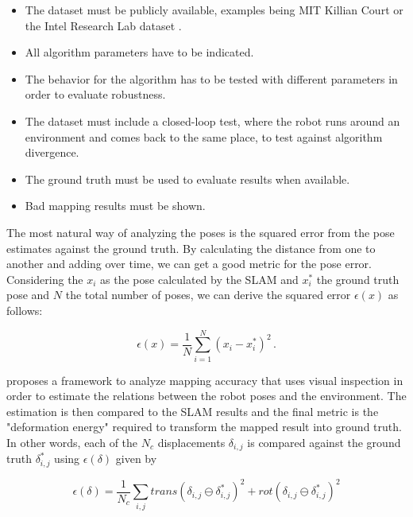 \begin{itemize}
    \item The dataset must be publicly available, examples being MIT Killian Court or the Intel Research Lab dataset \cite{kummerle2009measuring}.
    \item All algorithm parameters have to be indicated.
    \item The behavior for the algorithm has to be tested with different parameters in order to evaluate robustness.
    \item The dataset must include a closed-loop test, where the robot runs around an environment and comes back to the same place, to test against algorithm divergence.
    \item The ground truth must be used to evaluate results when available.
    \item Bad mapping results must be shown.
\end{itemize}

The most natural way of analyzing the poses is the squared error from the pose estimates against the ground truth. By calculating the distance from one to another and adding over time, we can get a good metric for the pose error. Considering the $x_i$ as the pose calculated by the SLAM and $x_i^*$ the ground truth pose and $N$ the total number of poses, we can derive the squared error $\epsilon(x)$ as follows:

\begin{equation}\label{eq:error_squared}
\epsilon(x) = \frac{1}{N} \sum_{i = 1}^N (x_i - x_i^*)^2 \,.
\end{equation}

\citeauthor{kummerle2009measuring} proposes a framework to analyze mapping accuracy that uses visual inspection in order to estimate the relations between the robot poses and the environment. The estimation is then compared to the SLAM results and the final metric is the "deformation energy" required to transform the mapped result into ground truth. In other words, each of the $N_c$ displacements $\delta_{i,j}$ is compared against the ground truth $\delta_{i,j}^*$ using $\epsilon(\delta)$ given by

\begin{equation}\label{eq:displacement}
    \epsilon(\delta) = \frac{1}{N_c} \sum_{i, j} trans(\delta_{i,j} \ominus \delta_{i,j}^*)^2 + rot(\delta_{i,j} \ominus \delta_{i,j}^*)^2
\end{equation}

